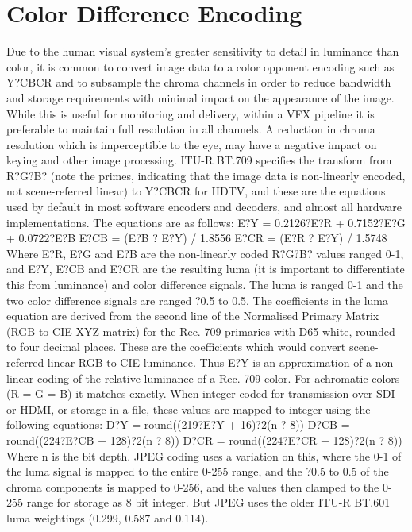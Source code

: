 \section{Color Difference Encoding}%
\label{sec:color-difference-encoding}

Due to the human visual system's greater sensitivity to detail in luminance than color, it is common to convert image data to a color opponent encoding such as Y?CBCR and to subsample the chroma channels in order to reduce bandwidth and storage requirements with minimal impact on the appearance of the image. While this is useful for monitoring and delivery, within a VFX pipeline it is preferable to maintain full resolution in all channels. A reduction in chroma resolution which is imperceptible to the eye, may have a negative impact on keying and other image processing.
ITU-R BT.709 specifies the transform from R?G?B? (note the primes, indicating that the image data is non-linearly encoded, not scene-referred linear) to Y?CBCR for HDTV, and these are the equations used by default in most software encoders and decoders, and almost all hardware implementations. The equations are as follows:
	E?Y = 0.2126?E?R + 0.7152?E?G + 0.0722?E?B
	E?CB =  (E?B ? E?Y) / 1.8556
	E?CR =  (E?R ? E?Y) / 1.5748
Where E?R, E?G and E?B are the non-linearly coded R?G?B? values ranged 0-1, and E?Y, E?CB and E?CR are the resulting luma (it is important to differentiate this from luminance) and color difference signals. The luma is ranged 0-1 and the two color difference signals are ranged ?0.5 to 0.5.
The coefficients in the luma equation are derived from the second line of the Normalised Primary Matrix (RGB to CIE XYZ matrix) for the Rec. 709 primaries with D65 white, rounded to four decimal places. These are the coefficients which would convert scene-referred linear RGB to CIE luminance. Thus E?Y is an approximation of a non-linear coding of the relative luminance of a Rec. 709 color. For achromatic colors (R = G = B) it matches exactly.
When integer coded for transmission over SDI or HDMI, or storage in a file, these values are mapped to integer using the following equations:
	D?Y = round((219?E?Y + 16)?2(n ? 8))
	D?CB = round((224?E?CB + 128)?2(n ? 8))
	D?CR = round((224?E?CR + 128)?2(n ? 8))
Where n is the bit depth.
JPEG coding uses a variation on this, where the 0-1 of the luma signal is mapped to the entire 0-255 range, and the ?0.5 to 0.5 of the chroma components is mapped to 0-256, and the values then clamped to the 0-255 range for storage as 8 bit integer. But JPEG uses the older ITU-R BT.601 luma weightings (0.299, 0.587 and 0.114).
